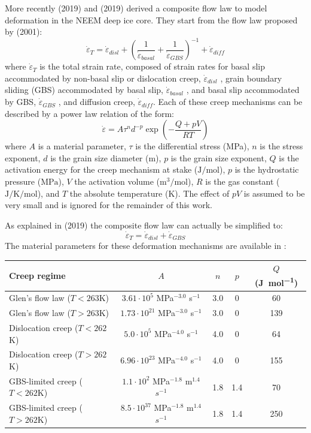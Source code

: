 More recently \textcite{kuwd19} (2019) and \textcite{kudd19} (2019) derived a composite flow law 
to model deformation in the NEEM deep ice core. 
They start from the flow law proposed by \textcite{goko01} (2001):
\[
\dot{\varepsilon}_T = \dot{\varepsilon}_{disl} + 
\left(\frac{1}{ \dot{\varepsilon}_{basal}} + \frac{1}{ \dot{\varepsilon}_{GBS}} \right)^{-1} 
+  \dot{\varepsilon}_{diff}
\]
where $\dot{\varepsilon}_T$  is the total strain rate, 
composed of strain rates for basal slip accommodated by non-basal slip or dislocation creep,
$\dot{\varepsilon}_{disl}$ , grain boundary sliding (GBS) accommodated by basal slip, 
$\dot{\varepsilon}_{basal}$ , and basal slip accommodated by GBS, 
$\dot{\varepsilon}_{GBS}$ , and diffusion creep, 
$\dot{\varepsilon}_{diff}$. Each of these creep mechanisms can be described by a 
power law relation of the form:
\[
\dot{\varepsilon} = A \tau^n d^{-p} \exp \left( -\frac{Q+pV}{RT} \right)
\]
where $A$ is a material parameter, $\tau$ is the differential stress (MPa), 
$n$ is the stress exponent, $d$ is the grain size diameter (\si{\meter}), 
$p$ is the grain size exponent, $Q$ is the activation energy for the creep 
mechanism at stake ($\si{\joule\per\mole}$), $p$ is the hydrostatic pressure ($\si{\mega\pascal}$), 
$V$ the activation volume ($\si{\cubic\meter\per\mole}$), 
$R$ is the gas constant ($\si{\joule\per\kelvin\per\mole}$), 
and $T$ the absolute temperature ($\si{\kelvin}$). 
The effect of $pV$ is assumed to be very small \cite{dust01} 
and is ignored for the remainder of this work.

As explained in \textcite{kuwd19} (2019) the composite flow law can actually be simplified to:
\[
\dot{\varepsilon}_T = \dot{\varepsilon}_{disl} + \dot{\varepsilon}_{GBS}
\]
The material parameters for these deformation mechanisms are available in \cite{kudd19}:
\begin{center}
\begin{tabular}{lcccc}
\hline
Creep regime & $A$ & $n$ & $p$ & $Q$ (\si{\joule\per\mole}) \\
\hline\hline
Glen's flow law ($T<263$K) &$3.61\cdot10^5$ MPa$^{-3.0}$ s$^{-1}$ &3.0 &0 &60\\
Glen's flow law ($T>263$K) &$1.73\cdot10^{21}$ MPa$^{-3.0}$ s$^{-1}$ &3.0 &0 &139\\
\hline
Dislocation creep ($T<262$K) & $5.0\cdot10^5$ MPa$^{-4.0}$ s$^{-1}$ &4.0 &0 &64\\
Dislocation creep ($T>262$K) &$6.96\cdot 10^{23}$ MPa$^{-4.0}$ s$^{-1}$ &4.0 &0 &155\\
\hline
GBS-limited creep ($T<262$K) & $1.1\cdot 10^2$ MPa$^{-1.8}$ m$^{1.4}$ $s^{-1}$ &1.8 &1.4 &70\\
GBS-limited creep ($T>262$K) & $8.5\cdot10^{37}$ MPa$^{-1.8}$ m$^{1.4}$ $s^{-1}$ &1.8 &1.4 &250\\
\hline
\end{tabular}
\end{center}

